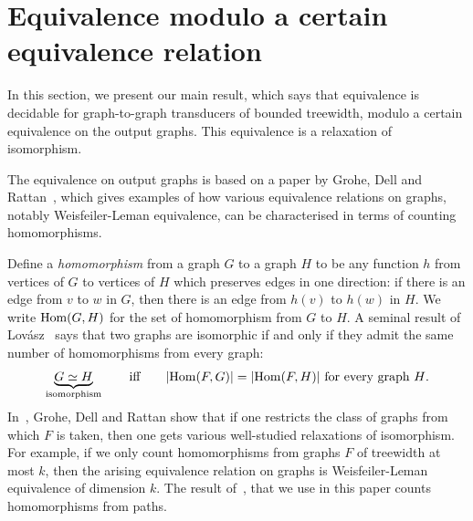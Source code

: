 
\section{Equivalence  modulo a certain equivalence relation}\label{sec:equivalence-modulo}
In this section, we present our main result, which says  that equivalence is decidable for graph-to-graph transducers of bounded treewidth, modulo a certain equivalence on the output graphs. This equivalence is a relaxation of isomorphism.  

 The equivalence on output graphs is based on a paper by Grohe, Dell and Rattan~\cite{groheDellRattan2018}, which gives examples of how various equivalence relations on graphs, notably Weisfeiler-Leman equivalence, can be characterised in terms of counting homomorphisms. 

Define a \emph{homomorphism} from a graph $G$ to a graph $H$ to be any function $h$ from vertices of $G$ to vertices of $H$ which preserves edges in one direction: if there is an edge from $v$ to $w$ in $G$, then there is an edge from $h(v)$ to $h(w)$ in $H$. We write $\mathrm {Hom}(G,H)$ for the set of homomorphism from $G$ to $H$. A seminal result of  Lov\'asz~\cite[p.~326]{lovasz1967operations} says that two graphs are isomorphic if and only if they admit the same number of homomorphisms from every graph:
\begin{align*}
\underbrace{G \simeq H}_{\text{isomorphism}} \qquad \text{iff} \qquad  |\mathrm {Hom}(F,G)|=|\mathrm {Hom}(F,H)| \ \text{for every graph $H$.}
\end{align*}
In~\cite{groheDellRattan2018},
Grohe, Dell and Rattan show that if one restricts the  class of graphs from which $F$ is taken, then one gets various well-studied relaxations of isomorphism. For example, if we only count homomorphisms from graphs $F$ of treewidth at most $k$, then the arising equivalence relation on graphs is Weisfeiler-Leman equivalence of dimension $k$.  The result of~\cite{groheDellRattan2018},  that we use in this paper counts homomorphisms from paths.


